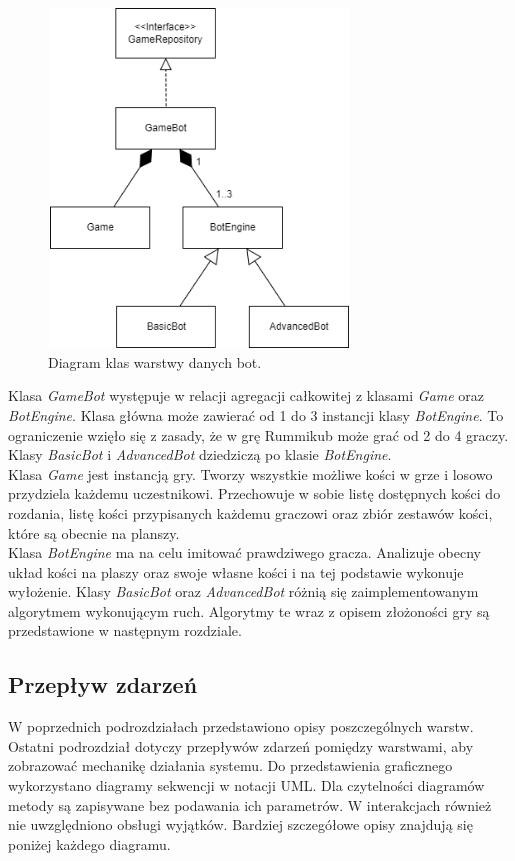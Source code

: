 \begin{figure}[h!]
	\begin{center}
		\includegraphics[width=8cm,height=9cm]{img/bot-client.png}
	\end{center}
	\caption{{\color{dgray}Diagram klas warstwy danych bot.}} 
	\label{bot}
\end{figure}

Klasa \emph{GameBot} występuje w relacji agregacji całkowitej z klasami \emph{Game} oraz \emph{BotEngine}. Klasa główna może zawierać od 1 do 3 instancji klasy \emph{BotEngine}. To ograniczenie wzięło się z zasady, że w grę Rummikub może grać od 2 do 4 graczy. Klasy \emph{BasicBot} i \emph{AdvancedBot} dziedziczą po klasie \emph{BotEngine}. \\
Klasa \emph{Game} jest instancją gry. Tworzy wszystkie możliwe kości w grze i losowo przydziela każdemu uczestnikowi. Przechowuje w sobie listę dostępnych kości do rozdania, listę kości przypisanych każdemu graczowi oraz zbiór zestawów kości, które są obecnie na planszy. \\
Klasa \emph{BotEngine} ma na celu imitować prawdziwego gracza. Analizuje obecny układ kości na plaszy oraz swoje własne kości i na tej podstawie wykonuje wyłożenie. Klasy \emph{BasicBot} oraz \emph{AdvancedBot} różnią się zaimplementowanym algorytmem wykonującym ruch. Algorytmy te wraz z opisem złożoności gry są przedstawione w następnym rozdziale.

\subsection{Przepływ zdarzeń}

W poprzednich podrozdziałach przedstawiono opisy poszczególnych warstw. Ostatni podrozdział dotyczy przepływów zdarzeń pomiędzy warstwami, aby zobrazować mechanikę działania systemu. Do przedstawienia graficznego wykorzystano diagramy sekwencji w notacji UML. Dla czytelności diagramów metody są zapisywane bez podawania ich parametrów. W interakcjach również nie uwzględniono obsługi wyjątków. Bardziej szczegółowe opisy znajdują się poniżej każdego diagramu.

